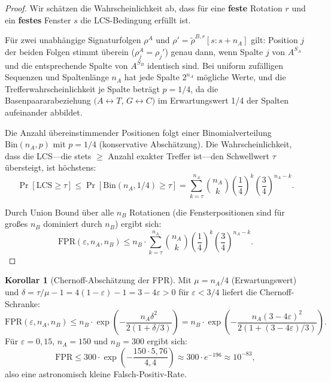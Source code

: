 ﻿\documentclass[a4paper,12pt]{article}
\theoremstyle{definition}
\newtheorem{korollar}{Korollar}
\begin{document}
\begin{proof}
    Wir sch\"{a}tzen die Wahrscheinlichkeit ab, dass f\"{u}r eine
    \textbf{feste} Rotation $r$ und ein \textbf{festes} Fenster $s$ die
    LCS-Bedingung erf\"{u}llt ist.

    F\"{u}r zwei unabh\"{a}ngige Signaturfolgen $\rho^A$ und
    $\rho' = \widetilde{\rho}^{B,r}[s:s+n_A]$ gilt: Position $j$ der
    beiden Folgen stimmt \"{u}berein ($\rho_j^A = \rho_j'$) genau dann,
    wenn Spalte $j$ von $A^{S_A}$ und die entsprechende Spalte von $A^{S_B}$
    identisch sind. Bei uniform zuf\"{a}lligen Sequenzen und
    Spaltenl\"{a}nge $n_A$ hat jede Spalte $2^{n_A}$ m\"{o}gliche
    Werte, und die Trefferwahrscheinlichkeit je Spalte betr\"{a}gt
    $p = 1/4$, da die Basenpaararabeziehung $(A \leftrightarrow T$,
    $G \leftrightarrow C)$ im Erwartungswert 1/4 der Spalten aufeinander
    abbildet.

    Die Anzahl \"{u}bereinstimmender Positionen folgt einer
    Binomialverteilung $\mathrm{Bin}(n_A, p)$ mit $p = 1/4$
    (konservative Absch\"{a}tzung). Die Wahrscheinlichkeit, dass die
    LCS---die stets $\geq$ Anzahl exakter Treffer ist---den Schwellwert
    $\tau$ \"{u}bersteigt, ist h\"{o}chstens:
    \[
        \Pr[\mathrm{LCS} \geq \tau] \leq
        \Pr\!\left[\mathrm{Bin}(n_A, 1/4) \geq \tau\right]
        = \sum_{k=\tau}^{n_A} \binom{n_A}{k}
        \left(\frac{1}{4}\right)^k
        \left(\frac{3}{4}\right)^{n_A - k}.
    \]

    Durch Union Bound \"{u}ber alle $n_B$ Rotationen (die Fensterpositionen
    sind f\"{u}r gro{\ss}es $n_B$ dominiert durch $n_B$) ergibt sich:
    \[
        \mathrm{FPR}(\varepsilon, n_A, n_B) \leq n_B \cdot
        \sum_{k=\tau}^{n_A} \binom{n_A}{k}
        \left(\frac{1}{4}\right)^k
        \left(\frac{3}{4}\right)^{n_A - k}.
    \]
\end{proof}

\begin{korollar}[Chernoff-Absch\"{a}tzung der FPR]
    \label{kor:chernoff_fpr}
    Mit $\mu = n_A / 4$ (Erwartungswert) und
    $\delta = \tau / \mu - 1 = 4(1-\varepsilon) - 1 = 3 - 4\varepsilon > 0$
    f\"{u}r $\varepsilon < 3/4$ liefert die Chernoff-Schranke:
    \[
        \mathrm{FPR}(\varepsilon, n_A, n_B) \leq n_B \cdot
        \exp\!\left(-\frac{n_A \delta^2}{2(1+\delta/3)}\right)
        = n_B \cdot \exp\!\left(-\frac{n_A (3-4\varepsilon)^2}{2(1+(3-4\varepsilon)/3)}\right).
    \]
    F\"{u}r $\varepsilon = 0{,}15$, $n_A = 150$ und $n_B = 300$ ergibt sich:
    \[
        \mathrm{FPR} \leq 300 \cdot \exp\!\left(-\frac{150 \cdot 5{,}76}{4{,}4}\right)
        \approx 300 \cdot e^{-196} \approx 10^{-83},
    \]
    also eine astronomisch kleine Falsch-Positiv-Rate.
\end{korollar}
\end{document}

